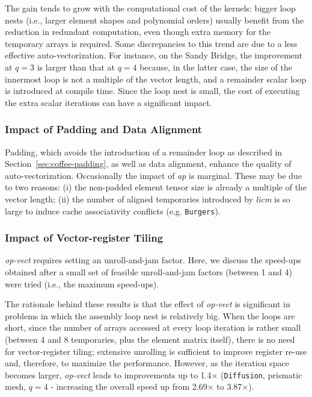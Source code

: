 The gain tends to grow with the computational cost of the kernels: bigger loop nests (i.e., larger element shapes and polynomial orders) usually benefit from the reduction in redundant computation, even though extra memory for the temporary arrays is required. Some discrepancies to this trend are due to a less effective auto-vectorization. For instance, on the Sandy Bridge, the improvement at $q=3$ is larger than that at $q=4$ because, in the latter case, the size of the innermost loop is not a multiple of the vector length, and a remainder scalar loop is introduced at compile time. Since the loop nest is small, the cost of executing the extra scalar iterations can have a significant impact.

\subsubsection{Impact of Padding and Data Alignment}
\label{sec:perf-eval-padding}

Padding, which avoids the introduction of a remainder loop as described in Section~\ref{sec:coffee-padding}, as well as data alignment, enhance the quality of auto-vectorization. Occasionally the impact of \emph{ap} is marginal. These may be due to two reasons: (i) the non-padded element tensor size is already a multiple of the vector length; (ii) the number of aligned temporaries introduced by \emph{licm} is so large to induce cache associativity conflicts (e.g. {\tt Burgers}).

\subsubsection{Impact of Vector-register Tiling}
\label{sec:perf-eval-opvect}

\emph{op-vect} requires setting an unroll-and-jam factor. Here, we discuss the speed-ups obtained after a small set of feasible unroll-and-jam factors (between 1 and 4) were tried (i.e., the maximum speed-ups). 

The rationale behind these results is that the effect of \emph{op-vect} is significant in problems in which the assembly loop nest is relatively big. When the loops are short, since the number of arrays accessed at every loop iteration is rather small (between 4 and 8 temporaries, plus the element matrix itself), there is no need for
vector-register tiling; extensive unrolling is sufficient to improve register re-use and, therefore, to maximize the performance. However, as the iteration space becomes larger, \emph{op-vect} leads to improvements up to 1.4$\times$ ({\tt Diffusion}, prismatic mesh, $q=4$ - increasing the overall speed up from 2.69$\times$ to 3.87$\times$).

